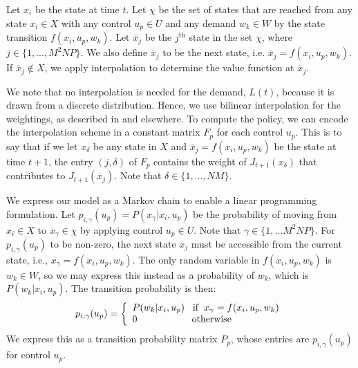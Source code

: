 \documentclass[conference]{IEEEtran}
\begin{document}
Let $x_{i}$ be the state at time $t$. Let $\chi$ be the set of states that are reached from any state $x_{i}\in X$ with any control $u_{p}\in U$ and any demand $w_{k}\in W$ by the state transition $f(x_{i},u_{p},w_{k})$. Let $\overline{x}_{j}$ be the $j^{\text{th}}$ state in the set $\chi$, where $j\in \{1,...,M^{2}NP\}$. We also define $\overline{x}_{j}$ to be the next state, i.e. $\overline{x}_{j}=f(x_{i},u_{p},w_{k})$. If $\overline{x}_{j}\not\in X$, we apply interpolation to determine the value function at $\overline{x}_{j}$.

We note that no interpolation is needed for the demand, $L(t)$, because it is drawn from a discrete distribution. Hence, we use bilinear interpolation for the weightings, as described in \cite[p.~319]{MultiLinInterp} and elsewhere. To  compute the policy, we can encode the interpolation scheme in a constant matrix $F_{p}$ for each control $u_{p}$. This is to say that if we let $x_{\delta}$ be any state in $X$ and $\overline{x}_{j}=f(x_{i},u_{p},w_{k})$ be the state at time $t+1$, the entry $(j,\delta)$ of $F_{p}$ contains the weight of $J_{t+1}(x_{\delta})$ that contributes to $J_{t+1}(\overline{x}_{j})$. Note that $\delta\in\{1,...,NM\}$.

We express our model as a Markov chain to enable a linear programming formulation. Let $p_{i,\gamma}(u_{p})=P(x_{\gamma}| x_{i},u_{p})$ be the probability of moving from $x_{i}\in X$ to $\overline{x}_{\gamma}\in \chi$ by applying control $u_{p}\in U$. Note that $\gamma\in\{1,...M^{2}NP\}$. For $p_{i,\gamma}(u_{p})$ to be non-zero, the next state $x_{j}$ must be accessible from the current state, i.e., $x_{\gamma}=f(x_{i},u_{p},w_{k})$. The only random variable in $f(x_{i},u_{p},w_{k})$ is $w_{k}\in W$, so we may express this instead as a probability of $w_{k}$, which is $P(w_{k} | x_{i},u_{p})$. The transition probability is then:
\begin{equation} \label{eq:TransMtx}
p_{i,\gamma}(u_{p})=
\left\{
\begin{array}{l}
P(w_{k}|x_{i},u_{p}) \hspace{0.3cm} \text{if} \hspace{0.2cm} x_{\gamma}=f(x_{i},u_{p},w_{k})\\
0 \hspace{2.0cm} \text{otherwise}
\end{array}
\right.
\end{equation} We express this as a transition probability matrix $P_{p}$, whose entries are $p_{i,\gamma}(u_{p})$ for control $u_{p}$.
\end{document}
